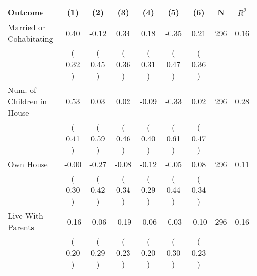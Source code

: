 \begin{tabular}{lcccccccc}
\toprule
 \textbf{Outcome} & \textbf{(1)} & \textbf{(2)} & \textbf{(3)} & \textbf{(4)} & \textbf{(5)} & \textbf{(6)} & \textbf{N} & \textbf{$ R^2$} \\
\midrule
Married or Cohabitating &      0.40 &     -0.12 &      0.34 &      0.18 &     -0.35 &      0.21 & 296 &       0.16 \\ 
 & (     0.32 ) & (     0.45 ) & (     0.36 ) & (     0.31 ) & (     0.47 ) & (     0.36 ) & \\
Num. of Children in House &      0.53 &      0.03 &      0.02 &     -0.09 &     -0.33 &      0.02 & 296 &       0.28 \\ 
 & (     0.41 ) & (     0.59 ) & (     0.46 ) & (     0.40 ) & (     0.61 ) & (     0.47 ) & \\
Own House &     -0.00 &     -0.27 &     -0.08 &     -0.12 &     -0.05 &      0.08 & 296 &       0.11 \\ 
 & (     0.30 ) & (     0.42 ) & (     0.34 ) & (     0.29 ) & (     0.44 ) & (     0.34 ) & \\
Live With Parents &     -0.16 &     -0.06 &     -0.19 &     -0.06 &     -0.03 &     -0.10 & 296 &       0.16 \\ 
 & (     0.20 ) & (     0.29 ) & (     0.23 ) & (     0.20 ) & (     0.30 ) & (     0.23 ) & \\
\bottomrule
\end{tabular}
